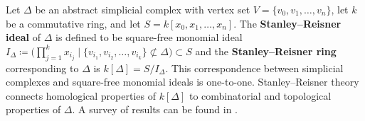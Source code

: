 \documentclass[12pt,leqno]{amsart}
\theoremstyle{definition}
\begin{document}
Let $\Delta$ be an abstract simplicial complex with vertex set
$V = \{v_0, v_1, \dotsc, v_n\}$, let $k$ be a commutative ring, and let
$S = k[x_0, x_1, \dotsc, x_n]$. The \textbf{Stanley--Reisner ideal} of
$\Delta$ is defined to be square-free monomial ideal
$I_\Delta \coloneq \bigl( \prod_{j=1}^k x_{i_j} \mathrel{\mid} \{
v_{i_1},v_{i_2},\dotsc,v_{i_k} \} \not \subset \Delta \bigr) \subset S$
%
%
and the \textbf{Stanley--Reisner ring} corresponding to $\Delta$ is
$k[\Delta] = S/I_\Delta$. This correspondence between simplicial complexes and
square-free monomial ideals is one-to-one. Stanley--Reisner theory connects
homological properties of $k[\Delta]$ to combinatorial and topological
properties of $\Delta$. A survey of results can be found in
\cite{BH, Stanley, MS}.
\end{document}

